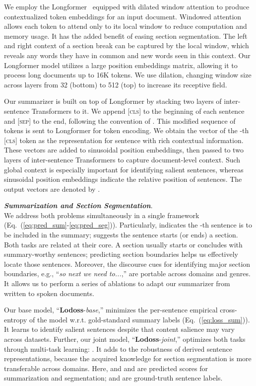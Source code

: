 \documentclass[11pt]{article}
\begin{document}
We employ the Longformer~\cite{Beltagy:2020} equipped with dilated window attention to 
produce contextualized token embeddings for an input document.
Windowed attention allows each token to attend only to its local window 
to reduce computation and memory usage.
It has the added benefit of easing section segmentation.
The left and right context of a section break can be captured by the local window,
which reveals any words they have in common and new words seen in this context.
Our Longformer model utilizes a large position embeddings matrix, allowing it to process long documents up to 16K tokens.
We use dilation, changing window size across layers from 32 (bottom) to 512 (top)
to increase its receptive field.


Our summarizer is built on top of Longformer by stacking two layers of inter-sentence Transformers to it.
We append \textsc{[cls]} to the beginning of each sentence and \textsc{[sep]} to the end,
following the convention of \cite{liu-lapata-2019-text}.
This modified sequence of tokens is sent to Longformer for token encoding. We obtain the vector of the -th \textsc{[cls]} token as the representation for sentence  with rich contextual information.
These vectors are added to sinusoidal position embeddings, 
then passed to two layers of inter-sentence Transformers 
to capture document-level context.
Such global context is especially important for identifying salient sentences,
whereas sinusoidal position embeddings indicate the relative position of sentences.
The output vectors are denoted by .


\vspace{0.04in}
\noindent \textbf{\textsl{Summarization and Section Segmentation}}.\\
We address both problems simultaneously in a single framework (Eq.~(\ref{eq:pred_sum}-\ref{eq:pred_seg})). 
Particularly,  indicates the -th sentence is to be included in the summary;
 suggests the sentence starts (or ends) a section.
Both tasks are related at their core.
A section usually starts or concludes with summary-worthy sentences;
predicting section boundaries helps us effectively locate those sentences.
Moreover, the discourse cues for identifying major section boundaries, e.g., ``\emph{so next we need to...},''
are portable across domains and genres.
It allows us to perform a series of ablations to adapt our summarizer from written to spoken documents.



Our base model, ``\textbf{Lodoss}-\emph{base},'' minimizes the per-sentence empirical cross-entropy of the model w.r.t. gold-standard summary labels (Eq.~(\ref{eq:loss_sum})).
It learns to identify salient sentences despite that content salience may vary across datasets.
Further, our joint model, ``\textbf{Lodoss}-\emph{joint},'' optimizes both tasks through multi-task learning: .
It adds to the robustness of derived sentence representations, 
because the acquired knowledge for section segmentation is more transferable across domains.
Here,  and  and are predicted scores for summarization and segmentation; 
 and  are ground-truth sentence labels.
\end{document}
